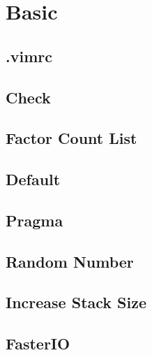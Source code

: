 \documentclass[a4paper,10pt,twocolumn,oneside]{article}
\begin{document}
\pagestyle{fancy}
\fancyfoot{}
\fancyhead[R]{\thepage}
\renewcommand{\headrulewidth}{0.4pt}
\renewcommand{\contentsname}{Contents}


\scriptsize

\tableofcontents


\section{Basic}

\subsection{.vimrc}


\subsection{Check}


\subsection{Factor Count List}


\subsection{Default}


\subsection{Pragma}


\subsection{Random Number}


\subsection{Increase Stack Size}


\subsection{FasterIO}

\end{document}
